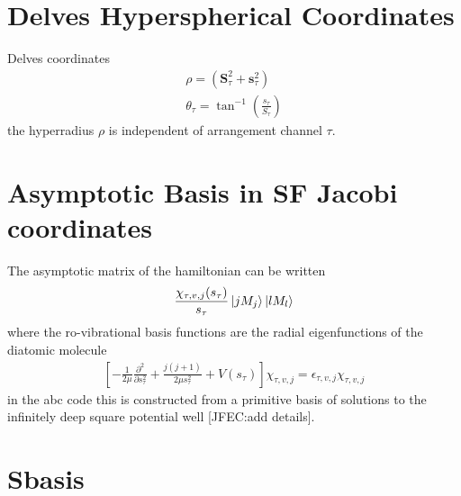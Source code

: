 \documentclass[aps,pra,onecolumn,showpacs,floatfix]{revtex4}
\begin{document}
\section{Delves Hyperspherical Coordinates}
Delves coordinates\cite{Delves:1958,Delves:1960}
\begin{align}\label{eqn:delves}
	\rho = (\mathbf{S}^2_\tau + \mathbf{s}^2_\tau ) \\
	\theta_\tau = \tan^{-1}({\frac{s_\tau}{S_\tau}})
\end{align}
the hyperradius $\rho$ is independent of arrangement channel $\tau$.

\section{Asymptotic Basis in SF Jacobi coordinates}
The asymptotic matrix of the hamiltonian can be written
\begin{align}\label{eqn:delves}
	\frac{\chi_{\tau,v,j}(s_\tau)}{s_\tau}\ket{jM_j}\ket{lM_l}
\end{align}
where the ro-vibrational basis functions are the radial eigenfunctions of the
diatomic molecule
\begin{align}\label{eqn:delves}
\left[-\frac{1}{2\mu}\frac{\partial^2}{\partial s_\tau^2} + \frac{j(j+1)}{2\mu s_\tau^2} + V(s_\tau)\right]\chi_{\tau,v,j}= \epsilon_{\tau,v,j}\chi_{\tau,v,j}
\end{align}
in the abc code this is constructed from a primitive basis of solutions to the
infinitely deep square potential well [JFEC:\@ add details].

\section{Sbasis}
\begin{acknowledgments}
\end{acknowledgments}


\end{document}
